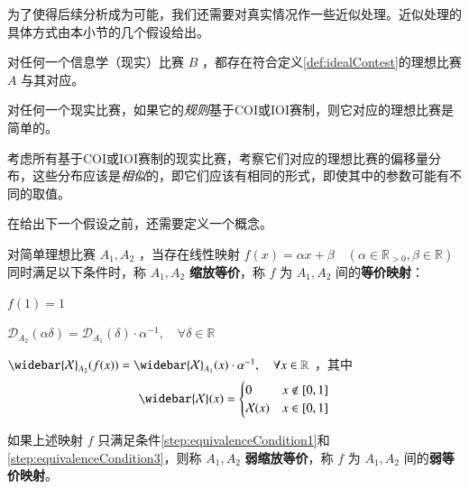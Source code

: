         为了使得后续分析成为可能，我们还需要对真实情况作一些近似处理。近似处理的具体方式由本小节的几个假设给出。

        \begin{assumption}
            对任何一个信息学（现实）比赛 $B$ ，都存在符合定义\ref{def:idealContest}的理想比赛 $A$ 与其对应。

            \label{ass:existenceOfIdealContest}
        \end{assumption}

        \begin{assumption}
            对任何一个现实比赛，如果它的\emph{规则}基于COI或IOI赛制，则它对应的理想比赛是简单的。

            \label{ass:simplicityOfCodingContests}
        \end{assumption}

        \begin{assumption}
            考虑所有基于COI或IOI赛制的现实比赛，考察它们对应的理想比赛的偏移量分布，这些分布应该是\emph{相似}的，即它们应该有相同的形式，即使其中的参数可能有不同的取值。

            \label{ass:similarityOfDeltaDistributions}
        \end{assumption}

        在给出下一个假设之前，还需要定义一个概念。

        \begin{definition}[缩放等价]
            对简单理想比赛 $A_1,A_2$ ，当存在线性映射 $f(x)=\alpha x+\beta\quad(\alpha\in\mathbb{R}_{> 0},\beta\in\mathbb{R})$ 同时满足以下条件时，称 $A_1,A_2$ \textbf{缩放等价}，称 $f$ 为 $A_1,A_2$ 间的\textbf{等价映射}：
            \begin{asparaenum}
                \item \label{step:equivalenceCondition1} $f(1)=1$
                \item $\mathcal{D}_{A_2}(\alpha\delta)=\mathcal{D}_{A_1}(\delta)\cdot \alpha^{-1},\quad\forall \delta\in\mathbb{R}$
                \item \label{step:equivalenceCondition3} $\widebar{\mathcal{X}}_{A_2}(f(x))=\widebar{\mathcal{X}}_{A_1}(x)\cdot \alpha^{-1},\quad\forall x\in\mathbb{R}$ ，其中
                    $$
                        \widebar{\mathcal{X}}(x)=
                        \begin{cases} 
                            0 & x\notin [0,1] \\
                            \mathcal{X}(x) & x\in[0,1]
                        \end{cases}
                    $$
            \end{asparaenum}

            如果上述映射 $f$ 只满足条件\ref{step:equivalenceCondition1}和\ref{step:equivalenceCondition3}，则称 $A_1,A_2$ \textbf{弱缩放等价}，称 $f$ 为 $A_1,A_2$ 间的\textbf{弱等价映射}。

            \label{def:equivalenceAfterScaling}
        \end{definition}

